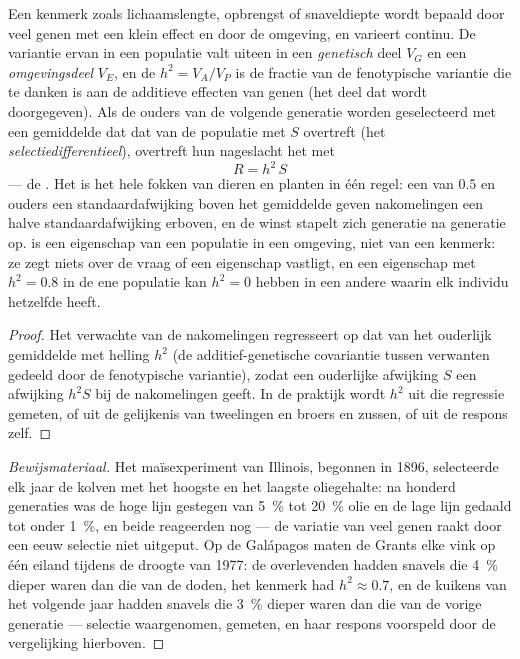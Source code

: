 \begin{theorem}\label{thm:b2:population-genetics:heritability}
Een kenmerk zoals lichaamslengte, opbrengst of snaveldiepte wordt bepaald door
veel genen met een klein effect en door de omgeving, en varieert continu. De
variantie ervan in een populatie valt uiteen in een \emph{genetisch} deel
$V_G$ en een \emph{omgevingsdeel} $V_E$, en de \emph{}
$h^{2} = V_A/V_P$ is de fractie van de fenotypische variantie die te danken
is aan de additieve effecten van genen (het deel dat wordt doorgegeven). Als
de ouders van de volgende generatie worden geselecteerd met een gemiddelde dat
dat van de populatie met $S$ overtreft (het \emph{selectiedifferentieel}),
overtreft hun nageslacht het met
\[
R = h^{2}\,S
\]
--- de \emph{}. Het is het hele fokken van dieren en
planten in één regel: een  van $0.5$ en ouders een
standaardafwijking boven het gemiddelde geven nakomelingen een halve
standaardafwijking erboven, en de winst stapelt zich generatie na generatie
op.  is een eigenschap van een populatie in een omgeving,
niet van een kenmerk: ze zegt niets over de vraag of een eigenschap vastligt,
en een eigenschap met $h^{2} = 0.8$ in de ene populatie kan
$h^{2} = 0$ hebben in een andere waarin elk individu hetzelfde
 heeft.
\end{theorem}
\begin{proof}
Het verwachte  van de nakomelingen regresseert op dat van het
ouderlijk gemiddelde met helling $h^{2}$ (de additief-genetische covariantie
tussen verwanten gedeeld door de fenotypische variantie), zodat een ouderlijke
afwijking $S$ een afwijking $h^{2}S$ bij de nakomelingen geeft. In de praktijk
wordt $h^{2}$ uit die regressie gemeten, of uit de gelijkenis van tweelingen en
broers en zussen, of uit de respons zelf.
\end{proof}
\begin{proof}[Bewijsmateriaal]
Het maïsexperiment van Illinois, begonnen in 1896, selecteerde elk jaar de
kolven met het hoogste en het laagste oliegehalte: na honderd generaties was
de hoge lijn gestegen van \qty{5}{\%} tot \qty{20}{\%} olie en de lage lijn
gedaald tot onder \qty{1}{\%}, en beide reageerden nog --- de variatie van
veel genen raakt door een eeuw selectie niet uitgeput. Op de Galápagos maten
de Grants elke vink op één eiland tijdens de droogte van 1977: de overlevenden
hadden snavels die \qty{4}{\%} dieper waren dan die van de doden, het kenmerk
had $h^{2}
\approx 0.7$, en de kuikens van het volgende jaar hadden snavels die
\qty{3}{\%} dieper waren dan die van de vorige generatie --- selectie
waargenomen, gemeten, en haar respons voorspeld door de vergelijking
hierboven.
\end{proof}

